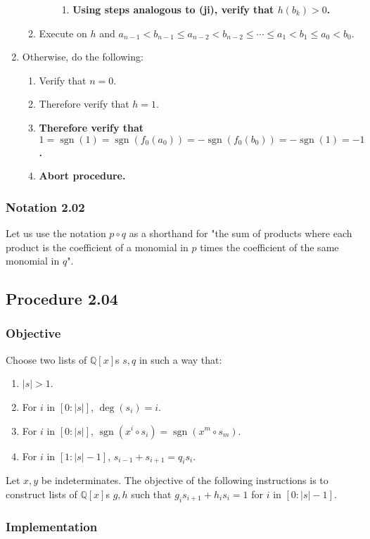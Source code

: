 \documentclass[twocolumn]{article}
\DeclareMathOperator{\sgn}{sgn}
\newcommand{\notation}[1]{\subsubsection*{Notation #1}}
\newcommand{\procedure}[2][]{\subsection*{Procedure #2 \ifthenelse{\equal{#1}{}}{}{(#1)}}\label{sec:procedure #2}}
\newcommand{\objective}{\subsubsection*{Objective}}
\newcommand{\implementation}{\subsubsection*{Implementation}}
\newcommand{\procedurehr}[2][]{\hyperref[sec:procedure #2]{\ifthenelse{\equal{#1}{}}{procedure #2}{#1}}}
\begin{document}
\begin{enumerate}
\begin{enumerate}
\begin{enumerate}
\begin{enumerate}
								\item \textbf{Using steps analogous to (ji), verify that $h(b_k)>0$.}
							\end{enumerate}
						\end{enumerate}
						\item Execute \procedurehr{2.03} on $h$ and $a_{n-1}<b_{n-1}\le a_{n-2}<b_{n-2}\le\cdots\le a_1<b_1\le a_0<b_0$.
					\end{enumerate}
					\item Otherwise, do the following:
					\begin{enumerate}
						\item Verify that $n=0$.
						\item Therefore verify that $h=1$.
						\item \textbf{Therefore verify that $1=\sgn(1)=\sgn(f_0(a_0))=-\sgn(f_0(b_0))=-\sgn(1)=-1$.}
						\item \textbf{Abort procedure.}
					\end{enumerate}
				\end{enumerate}
		\notation{2.02}
			Let us use the notation $p\circ q$ as a shorthand for "the sum of products where each product is the coefficient of a monomial in $p$ times the coefficient of the same monomial in $q$".
		\procedure{2.04}
			\objective
				Choose two lists of $\mathbb{Q}[x]$s $s,q$ in such a way that:
				\begin{enumerate}
					\item $\lvert s\rvert>1$.
					\item For $i$ in $[0:\lvert s\rvert]$, $\deg(s_i)=i$.
					\item For $i$ in $[0:\lvert s\rvert]$, $\sgn(x^i\circ s_i)=\sgn(x^m\circ s_m)$.
					\item For $i$ in $[1:\lvert s\rvert-1]$, $s_{i-1}+s_{i+1}=q_is_i$.
				\end{enumerate}
				Let $x,y$ be indeterminates. The objective of the following instructions is to construct lists of $\mathbb{Q}[x]$s $g,h$ such that $g_is_{i+1}+h_is_i=1$ for $i$ in $[0:\lvert s\rvert-1]$.
			\implementation
\end{document}
